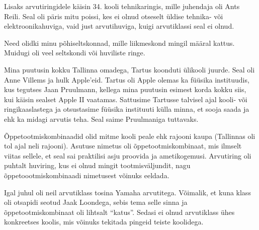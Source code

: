 Lisaks arvutiringidele käisin 34. kooli 
tehnikaringis, mille juhendaja oli Ants Reili. Seal oli 
päris mitu poissi, kes ei olnud otseselt üldise tehnika- 
või elektroonikahuviga, vaid just arvutihuviga, kuigi arvutiklassi
seal ei olnud.

Need olidki minu põhiseltskonnad, mille liikmeskond mingil määral kattus. Muidugi oli 
veel seltskondi või huviliste ringe.


Mina puutusin kokku Tallinna omadega, Tartus koonduti ülikooli 
juurde. Seal oli Anne Villems ja hulk
Apple'eid. Tartus oli Apple olemas ka füüsika 
instituudis, kus tegutses Jaan 
Pruulmann, kellega mina puutusin esimest korda kokku siis, 
kui käisin sealset Apple II vaatamas. Sattusime Tartusse talvisel ajal kooli- või 
ringikaaslastega ja otsustasime füüsika instituuti külla minna, 
et sooja saada ja ehk ka midagi
arvutis teha. Seal saime Pruulmaniga tuttavaks.

\label{content!OTK}

Õppetootmiskombinaadid olid mitme kooli peale ehk rajooni 
kaupa (Tallinnas oli tol ajal neli rajooni). 
Asutuse nimetus oli õppetootmiskombinaat, mis ilmselt viitas 
sellele, et seal sai praktilisi asju proovida ja 
ametikogemusi. Arvutiring oli puhtalt huviring, kus ei 
olnud mingit tootmisväljundit, nagu õppetoootmiskombinaadi nimetusest võinuks 
eeldada.


Igal juhul oli neil arvutiklass tosina Yamaha arvutitega. Võimalik, et 
kuna klass oli otsapidi seotud Jaak Loondega, sebis tema selle sinna ja õppetootmiskombinaat oli lihtsalt \enquote{katus}. 
Sedasi ei olnud arvutiklass ühes konkreetses koolis, mis võinuks tekitada pingeid teiste koolidega.


